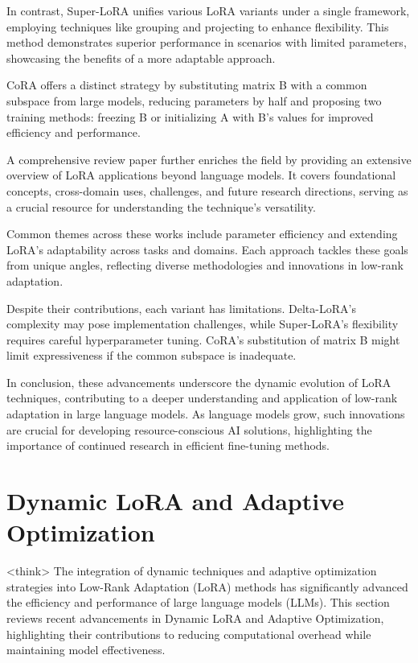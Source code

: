\documentclass[conference]{IEEEtran}
\begin{document}
In contrast, Super-LoRA unifies various LoRA variants under a single framework, employing techniques like grouping and projecting to enhance flexibility. This method demonstrates superior performance in scenarios with limited parameters, showcasing the benefits of a more adaptable approach.

CoRA offers a distinct strategy by substituting matrix B with a common subspace from large models, reducing parameters by half and proposing two training methods: freezing B or initializing A with B's values for improved efficiency and performance.

A comprehensive review paper further enriches the field by providing an extensive overview of LoRA applications beyond language models. It covers foundational concepts, cross-domain uses, challenges, and future research directions, serving as a crucial resource for understanding the technique's versatility.

Common themes across these works include parameter efficiency and extending LoRA's adaptability across tasks and domains. Each approach tackles these goals from unique angles, reflecting diverse methodologies and innovations in low-rank adaptation.

Despite their contributions, each variant has limitations. Delta-LoRA's complexity may pose implementation challenges, while Super-LoRA's flexibility requires careful hyperparameter tuning. CoRA's substitution of matrix B might limit expressiveness if the common subspace is inadequate.

In conclusion, these advancements underscore the dynamic evolution of LoRA techniques, contributing to a deeper understanding and application of low-rank adaptation in large language models. As language models grow, such innovations are crucial for developing resource-conscious AI solutions, highlighting the importance of continued research in efficient fine-tuning methods.

\section{Dynamic LoRA and Adaptive Optimization}
<think>
The integration of dynamic techniques and adaptive optimization strategies into Low-Rank Adaptation (LoRA) methods has significantly advanced the efficiency and performance of large language models (LLMs). This section reviews recent advancements in Dynamic LoRA and Adaptive Optimization, highlighting their contributions to reducing computational overhead while maintaining model effectiveness.
\end{document}
